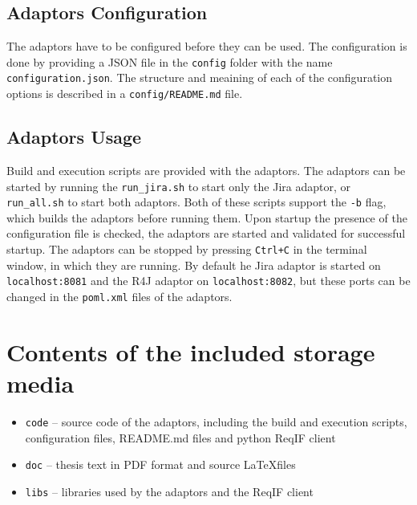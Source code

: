 \section{Adaptors Configuration}
The adaptors have to be configured before they can be used. The configuration is done by providing a JSON file in the \texttt{config} folder with the name \texttt{configuration.json}. The structure and meaining of each of the configuration options is described in a \texttt{config/README.md} file.

\section{Adaptors Usage}
Build and execution scripts are provided with the adaptors. The adaptors can be started by running the \texttt{run\_jira.sh} to start only the Jira adaptor, or \texttt{run\_all.sh} to start both adaptors. Both of these scripts support the \texttt{-b} flag, which builds the adaptors before running them. Upon startup the presence of the configuration file is checked, the adaptors are started and validated for successful startup. The adaptors can be stopped by pressing \texttt{Ctrl+C} in the terminal window, in which they are running. By default he Jira adaptor is started on \texttt{localhost:8081} and the R4J adaptor on \texttt{localhost:8082}, but these ports can be changed in the \texttt{poml.xml} files of the adaptors.

\chapter{Contents of the included storage media}
\begin{itemize}
    \item \texttt{code} -- source code of the adaptors, including the build and execution scripts, configuration files, {README.md} files and python ReqIF client
    \item \texttt{doc} -- thesis text in PDF format and source \LaTeX files
    \item \texttt{libs} -- libraries used by the adaptors and the ReqIF client
\end{itemize}

